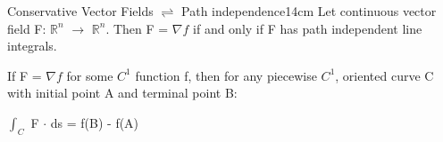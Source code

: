     \vspace{0.5cm}



    \begin{wtheorem}{Conservative Vector Fields $\rightleftharpoons$
    Path independence}{14cm}
        Let continuous vector field F: $\mathbb{R}^n$ $\rightarrow$ $\mathbb{R}^n$.
        Then F = $\nabla f$ if and only if F has path independent
        line integrals.

        If F = $\nabla f$ for some $C^1$ function f, then
        for any piecewise $C^1$, oriented curve C with initial point A and
        terminal point B:

        \hspace{0.5cm}
        $\int_C$ F $\cdot$ ds
        = f(B) - f(A)
    \end{wtheorem}




